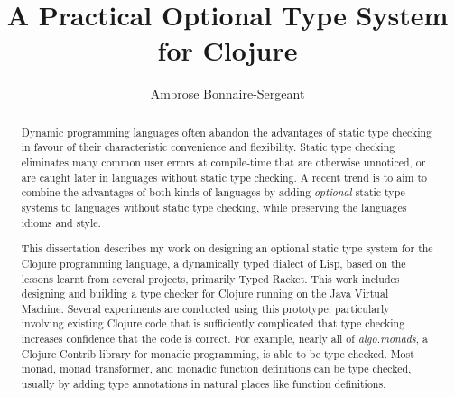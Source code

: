 \documentclass{cshonours}
\title{A Practical Optional Type System for Clojure}
\author{Ambrose Bonnaire-Sergeant}
\begin{document}
\maketitle

\begin{abstract}

%
%

Dynamic programming languages often abandon the advantages of static type checking 
in favour of their characteristic convenience and flexibility.
Static type checking eliminates many common user errors at compile-time that
are otherwise unnoticed, or are caught later in languages without static type checking.
A recent trend is to aim to combine the advantages of both kinds of languages by adding \emph{optional} static 
type systems to languages without static type checking, while preserving the languages idioms and style.

This dissertation describes my work on designing an optional static type system for the Clojure programming language,
a dynamically typed dialect of Lisp, based on
the lessons learnt from several projects, primarily Typed Racket.
This work includes designing and building a type checker for Clojure running on the Java Virtual Machine.
Several experiments are conducted using this prototype, particularly involving
existing Clojure code that is sufficiently complicated that
type checking increases confidence that the code is correct.
For example, nearly all of \emph{algo.monads}, a Clojure Contrib library for monadic programming, 
is able to be type checked.
Most monad, monad transformer, and monadic function definitions can be type checked,
usually by adding type annotations in natural places like function definitions.


\end{abstract}
\end{document}
